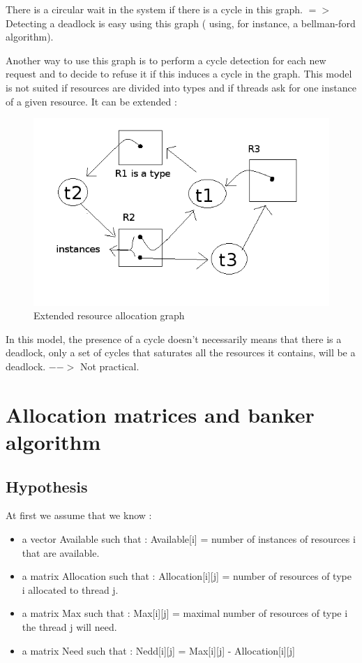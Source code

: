 \documentclass[a4paper,10pt]{article}
\begin{document}
There is a circular wait in the system if there is a cycle in this graph.
$=>$ Detecting a deadlock is easy using this graph ( using, for instance, a bellman-ford algorithm).

Another way to use this graph is to perform a cycle detection for each new request and to decide to refuse it if this induces a cycle in the graph.
This model is not suited if resources are divided into types and if threads ask for one instance of a given resource.
It can be extended :

\begin{figure}[h]
  \begin{center}
    \includegraphics[scale=0.6]{resource_graph_extended}
    \caption{Extended resource allocation graph}
    \label{}
  \end{center}
\end{figure}

In this model, the presence of a cycle doesn't necessarily means that there is a deadlock, only a set of cycles that saturates all the resources it contains, will be a deadlock. $-->$ Not practical.

\section{Allocation matrices and banker algorithm}

\subsection{Hypothesis}

At first we assume that we know :

\begin{itemize}
  \item a vector Available such that : Available[i] = number of instances of resources i that are available.
  \item a matrix Allocation such that : Allocation[i][j] = number of resources of type i allocated to thread j.
  \item a matrix Max such that : Max[i][j] = maximal number of resources of type i the thread j will need.
  \item a matrix Need such that : Nedd[i][j] = Max[i][j] - Allocation[i][j]
\end{itemize}
\end{document}
